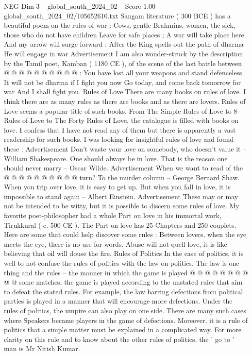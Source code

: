 \begin{textsample}{NEG Dim 3 – global\_south\_2024\_02 – Score 1.00 – global\_south\_2024\_02/105652610.txt}
Sangam literature ( 300 BCE ) has a beautiful poem on the rules of war : Cows, gentle Brahmins, women, the sick, those who do not have children Leave for safe places ; A war will take place here And my arrow will surge forward : After the King spells out the path of dharma He will engage in war Advertisement I am also wonder-struck by the description by the Tamil poet, Kamban ( 1180 CE ), of the scene of the last battle between @ @ @ @ @ @ @ @ @ @ : You have lost all your weapons and stand defenceless It will not be dharma if I fight you now Go today, and come back tomorrow for war And I shall fight you.
Rules of Love There are many books on rules of love.
I think there are as many rules as there are books and as there are lovers.
Rules of Love seems a popular title of such books.
From The Simple Rules of Love to 8 Rules of Love to The Forty Rules of Love, the catalogue is filled with books on love.
I confess that I have not read any of them but there is apparently a vast readership for such books.
I was looking for insightful rules of love and found these : Advertisement Don't waste your love on somebody, who doesn't value it -- William Shakespeare.
One should always be in love.
That is the reason one should never marry -- Oscar Wilde.
Advertisement When we want to read of the @ @ @ @ @ @ @ @ @ @ turn?
To the murder column -- George Bernard Shaw.
When you trip over love, it is easy to get up.
But when you fall in love, it is impossible to stand again -- Albert Einstein.
Advertisement These may or may not be intended to be witty, but it is possible to discern some rules of love.
My favorite poet-philosopher had a whole Part on love in his immortal work, Tirukkural ( c. 500 CE ).
The Part on love has 25 Chapters and 250 couplets.
Here are some that could help discover some rules : Between lovers, when the eye meets the eye, there is no use for words.
Abuse will not quell love, it is like believing that oil will douse the fire.
Rules of Politics In the case of politics, it is well to not confuse the rules of politics with the law on politics.
The law is one thing and the rules -- the manner in which the game is played @ @ @ @ @ @ @ @ @ @ some matches, the game is played according to the unstated rules that aim to defeat the stated rules.
For example, the law barring defections from political parties is played in a manner that will encourage more defections.
Under the rules of politics, the umpire can also play on one side.
There are many such cases where Speakers became players in the game of defections.
Moreover, it is a rule of politics that a simple matter must be explained in a complicated way.
For more clarity on this rule and to know about the other rules of politics, the ' go to ' man is Mr Nitish Kumar.

\end{textsample}
